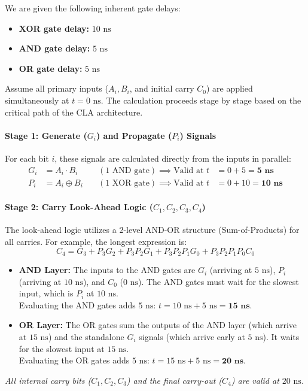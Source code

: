 \documentclass[12pt,a3paper]{article}
\begin{document}
\begin{enumerate}
\begin{tcolorbox}[enhanced,breakable,ansbox,colback=cD!4,colframe=cD,boxrule=0.8pt,arc=5pt,title={\textbf{Answer}},fonttitle=\bfseries\color{white},colbacktitle=cD]
We are given the following inherent gate delays:
\begin{itemize}
    \item \textbf{XOR gate delay:} $10\text{ ns}$
    \item \textbf{AND gate delay:} $5\text{ ns}$
    \item \textbf{OR gate delay:} $5\text{ ns}$
\end{itemize}
Assume all primary inputs ($A_i, B_i$, and initial carry $C_0$) are applied simultaneously at $t = 0\text{ ns}$. The calculation proceeds stage by stage based on the critical path of the CLA architecture.

\paragraph{Stage 1: Generate ($G_i$) and Propagate ($P_i$) Signals}
For each bit $i$, these signals are calculated directly from the inputs in parallel:
\begin{align*}
    G_i &= A_i \cdot B_i &\quad (\text{1 AND gate}) \implies \text{Valid at } t &= 0 + 5 = \mathbf{5\text{ ns}} \\
    P_i &= A_i \oplus B_i &\quad (\text{1 XOR gate}) \implies \text{Valid at } t &= 0 + 10 = \mathbf{10\text{ ns}}
\end{align*}

\paragraph{Stage 2: Carry Look-Ahead Logic ($C_1, C_2, C_3, C_4$)}
The look-ahead logic utilizes a 2-level AND-OR structure (Sum-of-Products) for all carries. For example, the longest expression is:
\[
    C_4 = G_3 + P_3G_2 + P_3P_2G_1 + P_3P_2P_1G_0 + P_3P_2P_1P_0C_0
\]
\begin{itemize}
    \item \textbf{AND Layer:} The inputs to the AND gates are $G_i$ (arriving at $5\text{ ns}$), $P_i$ (arriving at $10\text{ ns}$), and $C_0$ ($0\text{ ns}$). The AND gates must wait for the slowest input, which is $P_i$ at $10\text{ ns}$. \\
    Evaluating the AND gates adds $5\text{ ns}$: \quad $t = 10\text{ ns} + 5\text{ ns} = \mathbf{15\text{ ns}}$.
    
    \item \textbf{OR Layer:} The OR gates sum the outputs of the AND layer (which arrive at $15\text{ ns}$) and the standalone $G_i$ signals (which arrive early at $5\text{ ns}$). It waits for the slowest input at $15\text{ ns}$. \\
    Evaluating the OR gates adds $5\text{ ns}$: \quad $t = 15\text{ ns} + 5\text{ ns} = \mathbf{20\text{ ns}}$.
\end{itemize}
\textit{All internal carry bits ($C_1, C_2, C_3$) and the final carry-out ($C_4$) are valid at $20\text{ ns}$.}


\end{tcolorbox}
\end{enumerate}
\end{document}

